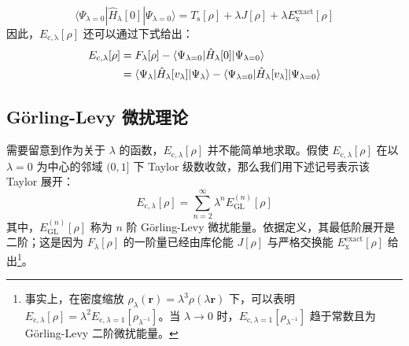 \begin{equation*}
  \langle \Psi_{\lambda=0} | \hat H_\lambda [0] | \Psi_{\lambda=0} \rangle = T_\mathrm{s} [\rho] + \lambda J[\rho] + \lambda E_\mathrm{x}^\mathrm{exact} [\rho]
\end{equation*}
因此，$E_\mathrm{c, \lambda} [\rho]$ 还可以通过下式给出：
\begin{align}
  \label{eq.2.E-c-lambda-by-wavefunc}
  E_\mathrm{c, \lambda} [\rho] &= F_{\lambda} [\rho] - \langle \Psi_{\lambda=0} | \hat H_\lambda [0] | \Psi_{\lambda=0} \rangle \notag\\
  &= \langle \Psi_{\lambda} | \hat H_\lambda [v_\mathrm{\lambda}] | \Psi_{\lambda} \rangle - \langle \Psi_{\lambda=0} | \hat H_\lambda [v_\mathrm{\lambda}] | \Psi_{\lambda=0} \rangle
\end{align}

\subsection{G\"orling-Levy 微扰理论}

需要留意到作为关于 $\lambda$ 的函数，$E_{\mathrm{c}, \lambda} [\rho]$ 并不能简单地求取。假使 $E_{\mathrm{c}, \lambda} [\rho]$ 在以 $\lambda=0$ 为中心的邻域 $(0, 1]$ 下 Taylor 级数收敛，那么我们用下述记号表示该 Taylor 展开：
\begin{equation}
  \label{eq.2.e-c-lambda}
  E_{\mathrm{c}, \lambda} [\rho] = \sum_{n=2}^{\infty} \lambda^n E_\mathrm{GL}^{(n)} [\rho]
\end{equation}
其中，$E_\mathrm{GL}^{(n)} [\rho]$ 称为 $n$ 阶 G\"orling-Levy 微扰能量\cite{Goerling-Levy.PRB.1993, Goerling-Levy.PRA.1994}。依据定义，其最低阶展开是二阶；这是因为 $F_\lambda[\rho]$ 的一阶量已经由库伦能 $J[\rho]$ 与严格交换能 $E_\mathrm{x}^\mathrm{exact}[\rho]$ 给出\footnote{事实上，在密度缩放 $\rho_\lambda(\bm{r}) = \lambda^3 \rho(\lambda \bm{r})$ 下，可以表明 $E_{\mathrm{c}, \lambda} [\rho] = \lambda^2 E_{\mathrm{c}, \lambda=1} [\rho_{\lambda^{-1}}]$\cite{Levy-Perdew.PRA.1985, Levy-Parr.JCP.1985}。当 $\lambda \rightarrow 0$ 时，$E_{\mathrm{c}, \lambda=1} [\rho_{\lambda^{-1}}]$ 趋于常数且为 G\"orling-Levy 二阶微扰能量\cite{Goerling-Levy.PRB.1993}。}。

